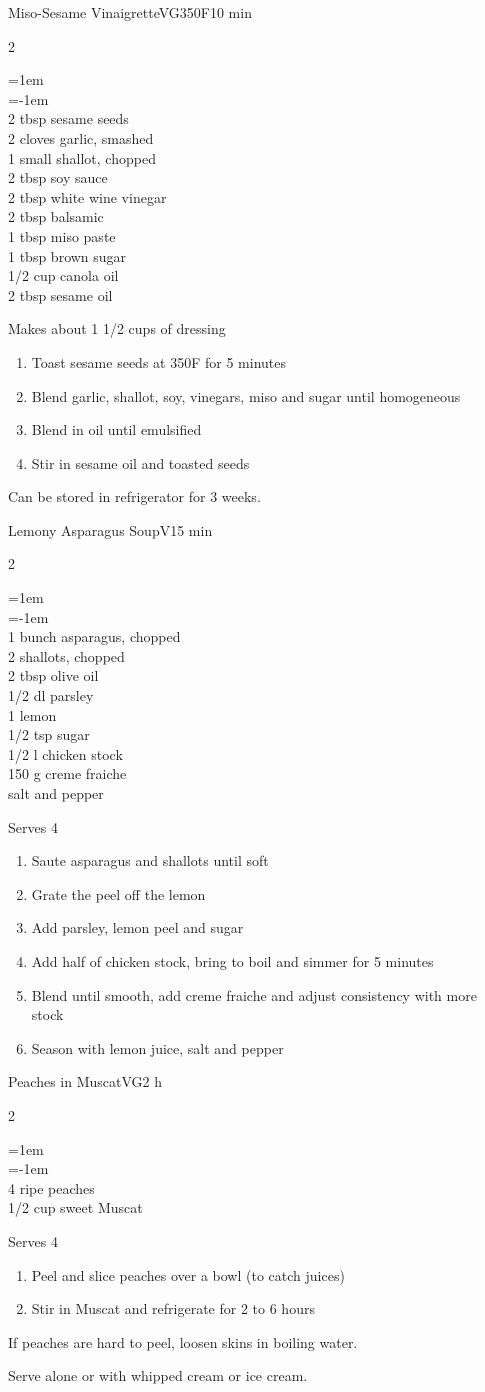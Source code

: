 \documentclass{article}
\newenvironment{recipe}[3][]
    {\begin{cardbase}[#1]{#2}{#3}
    \columnratio{0.333}
    \begin{paracol}{2}}
    {\end{paracol}\end{cardbase}}
\newcommand{\nextcolumn}{\switchcolumn}
\newenvironment{ingredients}
    {
    \begin{obeylines}
    \vspace{\parskip}
    \setlength{\parskip}{0.25em}
    \vspace{-0.25em}
    \leftskip=1em
    \parindent=-1em}
    {\end{obeylines}}
\newenvironment{steps}
    {\begin{enumerate}[leftmargin=*,topsep=0pt]}
    {\end{enumerate}}
\newcommand{\fahrenheit}[1]{#1\textdegree{}F}
\newcommand{\tag}[1]{\hspace{1em}#1}
\newcommand{\symboltag}[2]{\tag{#1\hspace{0.4em}#2}}
\newcommand{\totaltime}[1]{\symboltag{\raisebox{-0.1em}{\small\StopWatchEnd}}{#1}}
\newcommand{\preheat}[1]{\symboltag{\Topbottomheat}{#1}}
\begin{document}
\begin{recipe}{Miso-Sesame Vinaigrette}{\tag{VG}\preheat{\fahrenheit{350}}\totaltime{10 min}}
\begin{ingredients}
2 tbsp sesame seeds
2 cloves garlic, smashed
1 small shallot, chopped
2 tbsp soy sauce
2 tbsp white wine vinegar
2 tbsp balsamic
1 tbsp miso paste
1 tbsp brown sugar
1/2 cup canola oil
2 tbsp sesame oil
\end{ingredients}
\nextcolumn
Makes about 1 1/2 cups of dressing
\begin{steps}
    \item Toast sesame seeds at \fahrenheit{350} for 5 minutes
    \item Blend garlic, shallot, soy, vinegars, miso and sugar until homogeneous
    \item Blend in oil until emulsified
    \item Stir in sesame oil and toasted seeds
\end{steps}
Can be stored in refrigerator for 3 weeks.
\end{recipe}

\begin{recipe}{Lemony Asparagus Soup}{\tag{V}\totaltime{15 min}}
\begin{ingredients}
1 bunch asparagus, chopped
2 shallots, chopped
2 tbsp olive oil
1/2 dl parsley
1 lemon
1/2 tsp sugar
1/2 l chicken stock
150 g creme fraiche
salt and pepper
\end{ingredients}
\nextcolumn
Serves 4
\begin{steps}
    \item Saute asparagus and shallots until soft
    \item Grate the peel off the lemon
    \item Add parsley, lemon peel and sugar
    \item Add half of chicken stock, bring to boil and simmer for 5 minutes
    \item Blend until smooth, add creme fraiche and adjust consistency with more stock
    \item Season with lemon juice, salt and pepper
\end{steps}
\end{recipe}

\begin{recipe}{Peaches in Muscat}{\tag{VG}\totaltime{2 h}}
\begin{ingredients}
4 ripe peaches
1/2 cup sweet Muscat
\end{ingredients}
\nextcolumn
Serves 4
\begin{steps}
    \item Peel and slice peaches over a bowl (to catch juices)
    \item Stir in Muscat and refrigerate for 2 to 6 hours
\end{steps}
If peaches are hard to peel, loosen skins in boiling water.

Serve alone or with whipped cream or ice cream.
\end{recipe}
\end{document}
